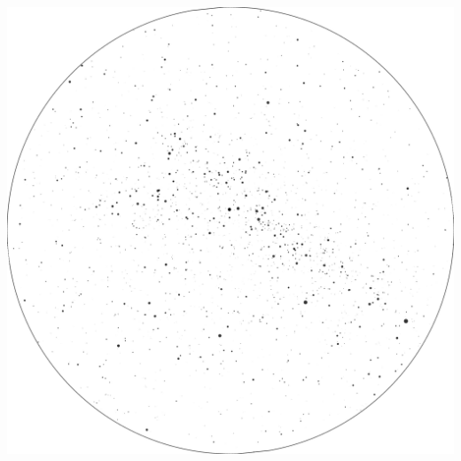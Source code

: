 \documentclass{./SAS-class-skygen}
\begin{document}
	\vspace{0.5cm}
    \begin{center}
    \includegraphics[width=\textwidth]{./pics/skychart30.png}
    \end{center}
    
    
\end{document}
